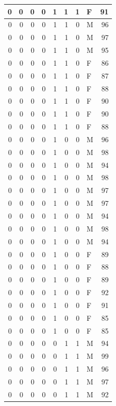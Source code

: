 \documentclass[
  12pt,
]{krantz}
\begin{document}
\begin{tabular}{r|r|r|r|r|r|r|l|r}
\hline
0 & 0 & 0 & 0 & 1 & 1 & 1 & F & 91\\
\hline
0 & 0 & 0 & 0 & 1 & 1 & 0 & M & 96\\
\hline
0 & 0 & 0 & 0 & 1 & 1 & 0 & M & 97\\
\hline
0 & 0 & 0 & 0 & 1 & 1 & 0 & M & 95\\
\hline
0 & 0 & 0 & 0 & 1 & 1 & 0 & F & 86\\
\hline
0 & 0 & 0 & 0 & 1 & 1 & 0 & F & 87\\
\hline
0 & 0 & 0 & 0 & 1 & 1 & 0 & F & 88\\
\hline
0 & 0 & 0 & 0 & 1 & 1 & 0 & F & 90\\
\hline
0 & 0 & 0 & 0 & 1 & 1 & 0 & F & 90\\
\hline
0 & 0 & 0 & 0 & 1 & 1 & 0 & F & 88\\
\hline
0 & 0 & 0 & 0 & 1 & 0 & 0 & M & 96\\
\hline
0 & 0 & 0 & 0 & 1 & 0 & 0 & M & 98\\
\hline
0 & 0 & 0 & 0 & 1 & 0 & 0 & M & 94\\
\hline
0 & 0 & 0 & 0 & 1 & 0 & 0 & M & 98\\
\hline
0 & 0 & 0 & 0 & 1 & 0 & 0 & M & 97\\
\hline
0 & 0 & 0 & 0 & 1 & 0 & 0 & M & 97\\
\hline
0 & 0 & 0 & 0 & 1 & 0 & 0 & M & 94\\
\hline
0 & 0 & 0 & 0 & 1 & 0 & 0 & M & 98\\
\hline
0 & 0 & 0 & 0 & 1 & 0 & 0 & M & 94\\
\hline
0 & 0 & 0 & 0 & 1 & 0 & 0 & F & 89\\
\hline
0 & 0 & 0 & 0 & 1 & 0 & 0 & F & 88\\
\hline
0 & 0 & 0 & 0 & 1 & 0 & 0 & F & 89\\
\hline
0 & 0 & 0 & 0 & 1 & 0 & 0 & F & 92\\
\hline
0 & 0 & 0 & 0 & 1 & 0 & 0 & F & 91\\
\hline
0 & 0 & 0 & 0 & 1 & 0 & 0 & F & 85\\
\hline
0 & 0 & 0 & 0 & 1 & 0 & 0 & F & 85\\
\hline
0 & 0 & 0 & 0 & 0 & 1 & 1 & M & 94\\
\hline
0 & 0 & 0 & 0 & 0 & 1 & 1 & M & 99\\
\hline
0 & 0 & 0 & 0 & 0 & 1 & 1 & M & 96\\
\hline
0 & 0 & 0 & 0 & 0 & 1 & 1 & M & 97\\
\hline
0 & 0 & 0 & 0 & 0 & 1 & 1 & M & 92\\

\end{tabular}
\end{document}
